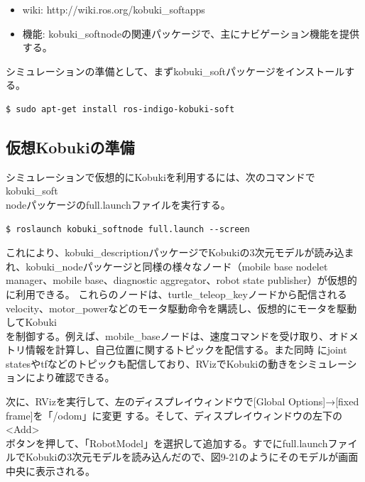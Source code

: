 \begin{itemize}
\begin{itemize}
\item wiki: http://wiki.ros.org/kobuki\_softapps
\item 機能: kobuki\_softnodeの関連パッケージで、主にナビゲーション機能を提供する。
\end{itemize}

シミュレーションの準備として、まずkobuki\_softパッケージをインストールする。

\begin{lstlisting}[language=ROS]
$ sudo apt-get install ros-indigo-kobuki-soft
\end{lstlisting}

\subsection{仮想Kobukiの準備}

シミュレーションで仮想的にKobukiを利用するには、次のコマンドでkobuki\_soft\\nodeパッケージのfull.launchファイルを実行する。

\begin{lstlisting}[language=ROS]
$ roslaunch kobuki_softnode full.launch --screen
\end{lstlisting}

これにより、kobuki\_descriptionパッケージでKobukiの3次元モデルが読み込まれ、kobuki\_nodeパッケージと同様の様々なノード（mobile base nodelet manager、mobile base、diagnostic aggregator、robot state publisher）が仮想的に利用できる。
これらのノードは、turtle\_teleop\_keyノードから配信されるvelocity、motor\_powerなどのモータ駆動命令を購読し、仮想的にモータを駆動してKobuki\\を制御する。例えば、mobile\_baseノードは、速度コマンドを受け取り、オドメトリ情報を計算し、自己位置に関するトピックを配信する。また同時
にjoint statesやtfなどのトピックも配信しており、RVizでKobukiの動きをシミュレーションにより確認できる。

次に、RVizを実行して、左のディスプレイウィンドウで[Global Options]→[fixed frame]を「/odom」に変更  する。そして、ディスプレイウィンドウの左下の<Add>\\ボタンを押して、「RobotModel」を選択して追加する。すでにfull.launchファイルでKobukiの3次元モデルを読み込んだので、図9-21のようにそのモデルが画面中央に表示される。


\end{itemize}
